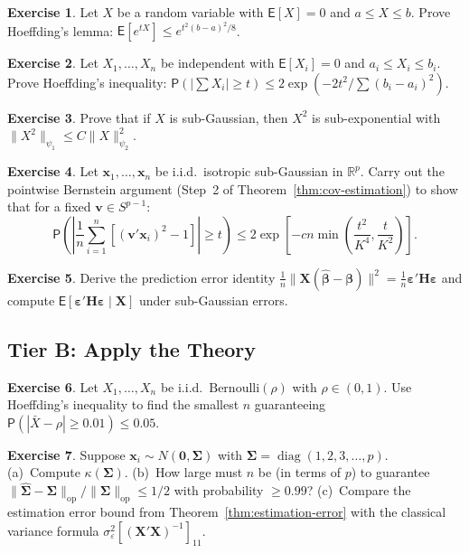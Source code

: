 \documentclass[14pt]{extarticle}
\theoremstyle{plain}
\theoremstyle{definition}
\newtheorem{exercise}{Exercise}[section]
\theoremstyle{remark}
\newcommand\expc{\mathsf{E}}
\newcommand\prb{\mathsf{P}}
\DeclareMathOperator\diag{diag}
\newcommand{\bX}{\mathbf{X}}
\newcommand{\bx}{\mathbf{x}}
\def\bb{\boldsymbol{\beta}}
\newcommand{\be}{\boldsymbol{\varepsilon}}
\newcommand{\bH}{\mathbf{H}}
\newcommand{\bzero}{\mathbf{0}}
\newcommand{\bv}{\mathbf{v}}
\newcommand{\Real}{\mathbb{R}}
\newcommand{\bSigma}{\boldsymbol{\Sigma}}
\newcommand{\hbSigma}{\hat{\boldsymbol{\Sigma}}}
\newcommand{\hbb}{\hat{\boldsymbol{\beta}}}
\newcommand{\opnorm}[1]{\|#1\|_{\mathrm{op}}}
\begin{document}
\begin{exercise}\label{ex:mA1}
Let $X$ be a random variable with $\expc[X] = 0$ and $a \leqslant X \leqslant b$. Prove Hoeffding's lemma: $\expc[e^{tX}] \leqslant e^{t^2(b-a)^2/8}$.
\end{exercise}

\begin{exercise}\label{ex:mA2}
Let $X_1, \ldots, X_n$ be independent with $\expc[X_i] = 0$ and $a_i \leqslant X_i \leqslant b_i$. Prove Hoeffding's inequality: $\prb(|\sum X_i| \geqslant t) \leqslant 2\exp(-2t^2/\sum(b_i - a_i)^2)$.
\end{exercise}

\begin{exercise}\label{ex:mA3}
Prove that if $X$ is sub-Gaussian, then $X^2$ is sub-exponential with $\|X^2\|_{\psi_1} \leqslant C\|X\|_{\psi_2}^2$.
\end{exercise}

\begin{exercise}\label{ex:mA4}
Let $\bx_1, \ldots, \bx_n$ be i.i.d.\ isotropic sub-Gaussian in $\Real^p$. Carry out the pointwise Bernstein argument (Step~2 of Theorem~\ref{thm:cov-estimation}) to show that for a fixed $\bv \in S^{p-1}$:
\[
\prb\!\left(\left|\frac{1}{n}\sum_{i=1}^n [(\bv'\bx_i)^2 - 1]\right| \geqslant t\right) \leqslant 2\exp\!\left[-cn\min\!\left(\frac{t^2}{K^4}, \frac{t}{K^2}\right)\right].
\]
\end{exercise}

\begin{exercise}\label{ex:mA5}
Derive the prediction error identity $\frac{1}{n}\|\bX(\hbb - \bb)\|^2 = \frac{1}{n}\be'\bH\be$ and compute $\expc[\be'\bH\be \mid \bX]$ under sub-Gaussian errors.
\end{exercise}

\subsection*{Tier B: Apply the Theory}

\begin{exercise}\label{ex:mB1}
Let $X_1, \ldots, X_n$ be i.i.d.\ $\mathrm{Bernoulli}(\rho)$ with $\rho \in (0,1)$. Use Hoeffding's inequality to find the smallest $n$ guaranteeing $\prb(|\bar{X} - \rho| \geqslant 0.01) \leqslant 0.05$.
\end{exercise}

\begin{exercise}\label{ex:mB2}
Suppose $\bx_i \sim N(\bzero, \bSigma)$ with $\bSigma = \diag(1, 2, 3, \ldots, p)$. (a)~Compute $\kappa(\bSigma)$. (b)~How large must $n$ be (in terms of $p$) to guarantee $\opnorm{\hbSigma - \bSigma}/\opnorm{\bSigma} \leqslant 1/2$ with probability $\geqslant 0.99$? (c)~Compare the estimation error bound from Theorem~\ref{thm:estimation-error} with the classical variance formula $\sigma_\varepsilon^2[(\bX'\bX)^{-1}]_{11}$.
\end{exercise}
\end{document}
